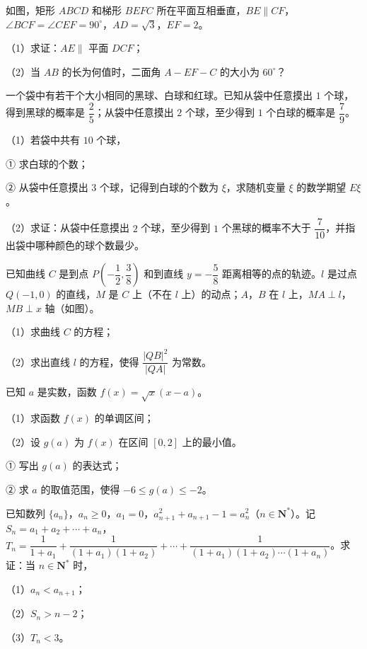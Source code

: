 \Needspace{0.4\textheight}
\begin{question}
如图，矩形 $ABCD$ 和梯形 $BEFC$ 所在平面互相垂直，$BE\parallel CF$，$\angle BCF=\angle CEF=90^\circ$，$AD=\sqrt3$，$EF=2$。

（1）求证：$AE\parallel$ 平面 $DCF$；

（2）当 $AB$ 的长为何值时，二面角 $A-EF-C$ 的大小为 $60^\circ$？
\nopagebreak[4]
\begin{center}\end{center}
\nopagebreak[4]
\end{question}
\begingroup
\renewenvironment{question}{\Needspace{0.5\textheight}}{}
\begin{question}
一个袋中有若干个大小相同的黑球、白球和红球。已知从袋中任意摸出 $1$ 个球，得到黑球的概率是 $\dfrac25$；从袋中任意摸出 $2$ 个球，至少得到 $1$ 个白球的概率是 $\dfrac79$。

（1）若袋中共有 $10$ 个球，

① 求白球的个数；

② 从袋中任意摸出 $3$ 个球，记得到白球的个数为 $\xi$，求随机变量 $\xi$ 的数学期望 $E\xi$。

（2）求证：从袋中任意摸出 $2$ 个球，至少得到 $1$ 个黑球的概率不大于 $\dfrac7{10}$，并指出袋中哪种颜色的球个数最少。

\Needspace{0.4\textheight}
\end{question}
\endgroup
\begin{question}
已知曲线 $C$ 是到点 $P\left(-\dfrac12,\dfrac38\right)$ 和到直线 $y=-\dfrac58$ 距离相等的点的轨迹。$l$ 是过点 $Q(-1,0)$ 的直线，$M$ 是 $C$ 上（不在 $l$ 上）的动点；$A$，$B$ 在 $l$ 上，$MA\perp l$，$MB\perp x$ 轴（如图）。

（1）求曲线 $C$ 的方程；

（2）求出直线 $l$ 的方程，使得 $\dfrac{|QB|^2}{|QA|}$ 为常数。
\nopagebreak[4]
\begin{center}\end{center}
\nopagebreak[4]
\end{question}
\begin{question}
已知 $a$ 是实数，函数 $f(x)=\sqrt x(x-a)$。

（1）求函数 $f(x)$ 的单调区间；

（2）设 $g(a)$ 为 $f(x)$ 在区间 $[0,2]$ 上的最小值。

① 写出 $g(a)$ 的表达式；

② 求 $a$ 的取值范围，使得 $-6\leqslant g(a)\leqslant-2$。

\end{question}
\begin{question}
已知数列 $\{a_n\}$，$a_n\geqslant0$，$a_1=0$，$a_{n+1}^2+a_{n+1}-1=a_n^2$（$n\in\mathbf N^*$）。记 $S_n=a_1+a_2+\cdots+a_n$，$T_n=\dfrac1{1+a_1}+\dfrac1{(1+a_1)(1+a_2)}+\cdots+\dfrac1{(1+a_1)(1+a_2)\cdots(1+a_n)}$。求证：当 $n\in\mathbf N^*$ 时，

（1）$a_n<a_{n+1}$；

（2）$S_n>n-2$；

（3）$T_n<3$。

\end{question}